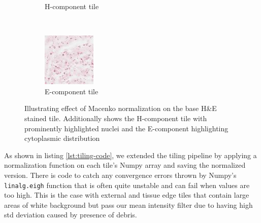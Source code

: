 \documentclass{l4proj}
\begin{document}
\begin{figure}[h]
\begin{subfigure}[b]{0.2\textwidth}
        \caption{H-component tile}
        \label{fig:h-tile}
    \end{subfigure}
    ~ %
    \begin{subfigure}[b]{0.2\textwidth}
        \includegraphics[width=\textwidth]{images/e.jpeg}
        \caption{E-component tile}
        \label{fig:e-tile}
    \end{subfigure}
    \caption{Illustrating effect of Macenko normalization on the base H\&E stained tile. Additionally shows the H-component tile with prominently highlighted nuclei and the E-component highlighting cytoplasmic distribution}
    \label{fig:macenko-code-example}
\end{figure}

 As shown in listing \ref{lst:tiling-code}, we extended the tiling pipeline by applying a normalization function on each tile's Numpy array and saving the normalized version. There is code to catch any convergence errors thrown by Numpy's \texttt{linalg.eigh} function that is often quite unstable and can fail when values are too high. This is the case with external and tissue edge tiles that contain large areas of white background but pass our mean intensity filter due to having high std deviation caused by presence of debris. 
\end{document}
